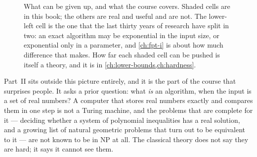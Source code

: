 \begin{figure}[ht]
\centering
{}
\caption{What can be given up, and what the course covers. Shaded cells are in
this book; the others are real and useful and are not. The lower-left cell is
the one that the last thirty years of research have split in two: an exact
algorithm may be exponential in the input size, or exponential only in a
parameter, and \cref{ch:fpt-i} is about how much difference that makes. How far
each shaded cell can be pushed is itself a theory, and it is in
\cref{ch:lower-bounds,ch:hardness}.}
\label{fig:intro-landscape}
\end{figure}

Part~II sits outside this picture entirely, and it is the part of the course
that surprises people. It asks a prior question: what \emph{is} an algorithm,
when the input is a set of real numbers? A computer that stores real numbers
exactly and compares them in one step is not a Turing machine, and the problems
that are complete for it --- deciding whether a system of polynomial
inequalities has a real solution, and a growing list of natural geometric
problems that turn out to be equivalent to it --- are not known to be in
\textrm{NP} at all. The classical theory does not say they are hard; it says it
cannot see them.

